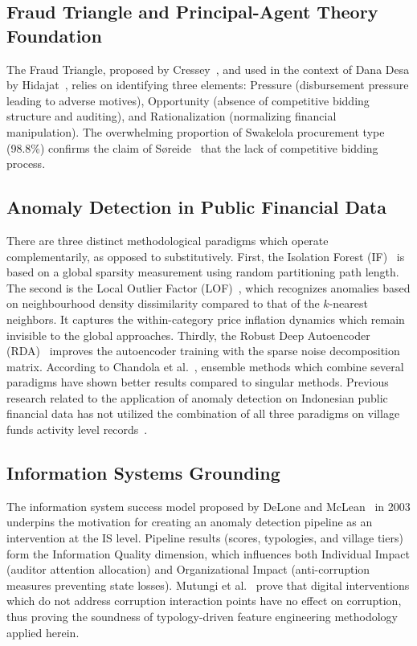 \documentclass[3p,times,procedia]{elsarticle}
\begin{document}
\subsection{Fraud Triangle and Principal-Agent Theory Foundation}

The Fraud Triangle, proposed by Cressey~\cite{ref21}, and used in the context of Dana Desa by Hidajat~\cite{ref12}, relies on identifying three elements: Pressure (disbursement pressure leading to adverse motives), Opportunity (absence of competitive bidding structure and auditing), and Rationalization (normalizing financial manipulation). The overwhelming proportion of Swakelola procurement type (98.8\%) confirms the claim of S{\o}reide~\cite{ref22} that the lack of competitive bidding process.

\subsection{Anomaly Detection in Public Financial Data}

There are three distinct methodological paradigms which operate complementarily, as opposed to substitutively. First, the Isolation Forest (IF)~\cite{ref24,ref25} is based on a global sparsity measurement using random partitioning path length. The second is the Local Outlier Factor (LOF)~\cite{ref26}, which recognizes anomalies based on neighbourhood density dissimilarity compared to that of the $k$-nearest neighbors. It captures the within-category price inflation dynamics which remain invisible to the global approaches. Thirdly, the Robust Deep Autoencoder (RDA)~\cite{ref27} improves the autoencoder training with the sparse noise decomposition matrix. According to Chandola et al.~\cite{ref28}, ensemble methods which combine several paradigms have shown better results compared to singular methods. Previous research related to the application of anomaly detection on Indonesian public financial data has not utilized the combination of all three paradigms on village funds activity level records~\cite{ref29,ref30}.

\subsection{Information Systems Grounding}

The information system success model proposed by DeLone and McLean~\cite{ref31} in 2003 underpins the motivation for creating an anomaly detection pipeline as an intervention at the IS level. Pipeline results (scores, typologies, and village tiers) form the Information Quality dimension, which influences both Individual Impact (auditor attention allocation) and Organizational Impact (anti-corruption measures preventing state losses). Mutungi et al.~\cite{ref11} prove that digital interventions which do not address corruption interaction points have no effect on corruption, thus proving the soundness of typology-driven feature engineering methodology applied herein.
\end{document}
